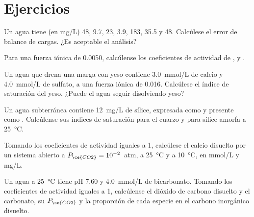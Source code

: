 \section{Ejercicios}

\begin{exercise}[$\star$]\label{exo:b3:water-rock-interaction:1}
Un agua tiene (en \unit{mg/L})  48,  9.7,  23,  3.9,
 183,  35.5 y  48. Calcúlese el error de balance
de cargas. ¿Es aceptable el análisis?
\end{exercise}

\begin{exercise}[$\star$]\label{exo:b3:water-rock-interaction:2}
Para una fuerza iónica de 0.0050, calcúlense los coeficientes de actividad de
,  y .
\end{exercise}

\begin{exercise}[$\star$]\label{exo:b3:water-rock-interaction:3}
Un agua que drena una marga con yeso contiene \qty{3.0}{mmol/L} de calcio y
\qty{4.0}{mmol/L} de sulfato, a una fuerza iónica de 0.016. Calcúlese el
índice de saturación del yeso. ¿Puede el agua seguir disolviendo yeso?
\end{exercise}

\begin{exercise}[$\star$]\label{exo:b3:water-rock-interaction:4}
Un agua subterránea contiene \qty{12}{mg/L} de sílice, expresada como  y
presente como . Calcúlense sus índices de saturación para el cuarzo y para
sílice amorfa a \qty{25}{\celsius}.
\end{exercise}

\begin{exercise}[$\star\star$]\label{exo:b3:water-rock-interaction:5}
Tomando los coeficientes de actividad iguales a 1, calcúlese el calcio disuelto por un
sistema abierto a $P_{\ce{CO2}} = 10^{-2}$~atm, a \qty{25}{\celsius} y a
\qty{10}{\celsius}, en \unit{mmol/L} y \unit{mg/L}.
\end{exercise}

\begin{exercise}[$\star\star$]\label{exo:b3:water-rock-interaction:6}
Un agua a \qty{25}{\celsius} tiene pH 7.60 y \qty{4.0}{mmol/L} de
bicarbonato. Tomando los coeficientes de actividad iguales a 1, calcúlense el dióxido de carbono
disuelto y el carbonato, su $P_{\ce{CO2}}$ y la proporción de cada especie en
el carbono inorgánico disuelto.
\end{exercise}

